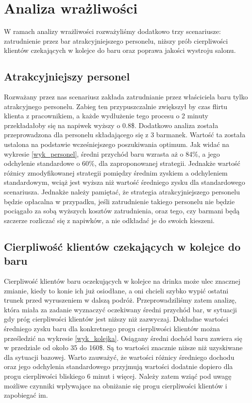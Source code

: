 \documentclass[12pt, a4paper, oneside]{mwart} %
\begin{document}
\section{Analiza wrażliwości}
W ramach analizy wrażliwości rozważyliśmy dodatkowo trzy scenariusze: zatrudnienie przez bar atrakcyjniejszego personelu, niższy prób cierpliwości klientów czekających w kolejce do baru oraz poprawa jakości wystroju salonu.

\subsection{Atrakcyjniejszy personel}
Rozważany przez nas scenariusz zakłada zatrudnianie przez właściciela baru tylko atrakcyjnego personelu. Zabieg ten przypuszczalnie zwiększył by czas flirtu klienta z pracownikiem, a każde wydłużenie tego procesu o 2 minuty przekładałoby się na napiwek wyższy o 0.8\$. Dodatkowo analiza została przeprowadzona dla personelu składającego się z 3 barmanek. Wartość ta została ustalona na podstawie wcześniejszego poszukiwania optimum. Jak widać na wykresie \ref{wyk_personel}, średni przychód baru wzrasta aż o 84\%, a jego odchylenie standardowe o 60\%, dla zaproponowanej strategii. Jednakże wartość różnicy zmodyfikowanej strategii pomiędzy średnim zyskiem a odchyleniem standardowym, wciąż jest wyższa niż wartość średniego zysku dla standardowego scenariusza. Jednakże należy pamiętać, że strategia atrakcyjniejszego personelu będzie opłacalna w przypadku, jeśli zatrudnienie takiego personelu nie będzie pociągało za sobą wyższych kosztów zatrudnienia, oraz tego, czy barmani będą szczerze rozliczać się z napiwków, a nie odkładać je do swoich kieszeni.

\subsection{Cierpliwość klientów czekających w kolejce do baru}
Cierpliwość klientów baru oczekujących w kolejce na drinka może ulec znacznej zmianie, kiedy to konie ich już osiodłane, a oni chcieli szybko wypić ostatni trunek przed wyruszeniem w dalszą podróż. Przeprowadziliśmy zatem analizę, która miała za zadanie wyznaczyć oczekiwany średni przychód bar, w sytuacji gdy próg cierpliwości klientów jest niższy niż zazwyczaj. Dokładne wartości średniego zysku baru dla konkretnego progu cierpliwości klientów można prześledzić na wykresie \ref{wyk_kolejka}. Osiągany średni dochód baru zawiera się w przedziale od około 35 do 160\$. Są to wartości znacznie niższe niż uzyskiwane dla sytuacji bazowej. Warto zauważyć, że wartości różnicy średniego dochodu oraz jego odchylenia standardowego przyjmują wartości dodatnie dopiero dla progu cierpliwości bliskiego 6 minut i więcej. Należy zatem wziąć pod uwagę możliwe czynniki wpływające na obniżanie się progu cierpliwości klientów i zapobiegać im.
\end{document}
